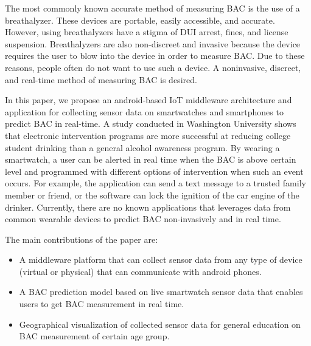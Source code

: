 The most commonly known accurate method of measuring BAC is the use of a breathalyzer. These devices are portable, easily accessible, and accurate. However, using breathalyzers have a stigma of DUI arrest, fines, and license suspension. Breathalyzers are also non-discreet and invasive because the device requires the user to blow into the device in order to measure BAC. Due to these reasons, people often do not want to use such a device. A noninvasive, discreet, and real-time method of measuring BAC is desired.

In this paper, we propose an android-based IoT middleware architecture and application for collecting sensor data on smartwatches and smartphones to predict BAC in real-time. A study conducted in Washington University \cite{Ward:2015} shows that electronic intervention programs are more successful at reducing college student drinking than a general alcohol awareness program. By wearing a smartwatch, a user can be alerted in real time when the BAC is above certain level and programmed with different options of intervention when such an event occurs. For example, the application can send a text message to a trusted family member or friend, or the software can lock the ignition of the car engine of the drinker. Currently, there are no known applications that leverages data from common wearable devices to predict BAC non-invasively and in real time.

The main contributions of the paper are:
\begin{itemize}
	\item A middleware platform that can collect sensor data from any type of device (virtual or physical) that can communicate with android phones. 
	\item A BAC prediction model based on live smartwatch sensor data that enables users to get BAC measurement in real time.
	\item Geographical visualization of collected sensor data for general education on BAC measurement of certain age group.
\end{itemize}

